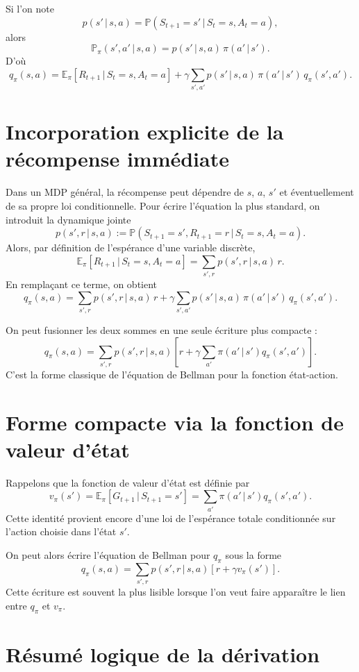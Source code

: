 \documentclass[11pt,a4paper]{article}
\newcommand{\E}{\mathbb{E}}
\newcommand{\Pbb}{\mathbb{P}}
\newcommand{\given}{\,|\,}
\begin{document}
Si l'on note
\[
p(s'\given s,a) = \Pbb(S_{t+1}=s' \given S_t=s, A_t=a),
\]
alors
\[
\Pbb_{\pi}(s',a' \given s,a) = p(s'\given s,a)\,\pi(a'\given s').
\]
D'où
\[
q_{\pi}(s,a)
= \E_{\pi}[R_{t+1} \given S_t=s, A_t=a]
+ \gamma \sum_{s',a'} p(s'\given s,a)\,\pi(a'\given s')\, q_{\pi}(s',a').
\]

\section{Incorporation explicite de la récompense immédiate}

Dans un MDP général, la récompense peut dépendre de $s$, $a$, $s'$ et éventuellement de sa propre loi conditionnelle. Pour écrire l'équation la plus standard, on introduit la dynamique jointe
\[
p(s',r \given s,a) := \Pbb(S_{t+1}=s', R_{t+1}=r \given S_t=s, A_t=a).
\]
Alors, par définition de l'espérance d'une variable discrète,
\[
\E_{\pi}[R_{t+1} \given S_t=s, A_t=a]
= \sum_{s',r} p(s',r \given s,a)\,r.
\]
En remplaçant ce terme, on obtient
\[
q_{\pi}(s,a)
= \sum_{s',r} p(s',r \given s,a)\,r
+ \gamma \sum_{s',a'} p(s'\given s,a)\,\pi(a'\given s')\, q_{\pi}(s',a').
\]

On peut fusionner les deux sommes en une seule écriture plus compacte :
\[
q_{\pi}(s,a)
= \sum_{s',r} p(s',r \given s,a)
\left[r + \gamma \sum_{a'} \pi(a'\given s') q_{\pi}(s',a')\right].
\]
C'est la forme classique de l'équation de Bellman pour la fonction état-action.

\section{Forme compacte via la fonction de valeur d'état}

Rappelons que la fonction de valeur d'état est définie par
\[
v_{\pi}(s') = \E_{\pi}[G_{t+1} \given S_{t+1}=s'] = \sum_{a'} \pi(a'\given s') q_{\pi}(s',a').
\]
Cette identité provient encore d'une loi de l'espérance totale conditionnée sur l'action choisie dans l'état $s'$.

On peut alors écrire l'équation de Bellman pour $q_{\pi}$ sous la forme
\[
q_{\pi}(s,a)
= \sum_{s',r} p(s',r \given s,a)\left[r + \gamma v_{\pi}(s')\right].
\]
Cette écriture est souvent la plus lisible lorsque l'on veut faire apparaître le lien entre $q_{\pi}$ et $v_{\pi}$.

\section{Résumé logique de la dérivation}
\end{document}
